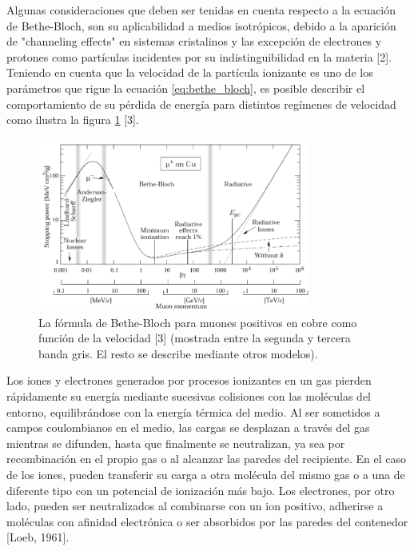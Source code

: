 \documentclass{article}
\begin{document}
\noindent Algunas consideraciones que deben ser tenidas en cuenta respecto a la ecuación de Bethe-Bloch, son su aplicabilidad a medios isotrópicos, debido a la aparición de "channeling effects" en sistemas cristalinos y las excepción de electrones y protones como partículas incidentes por su indistinguibilidad en la materia [2].\\

\noindent Teniendo en cuenta que la velocidad de la partícula ionizante es uno de los parámetros que rigue la ecuación \ref{eq:bethe_bloch}, es posible describir el comportamiento de su pérdida de energía para distintos regímenes de velocidad como ilustra la figura \ref{fig:bethe_b} [3].

\begin{figure}[H]
    \centering
    \includegraphics[width=0.8\textwidth]{bethe_bloch.PNG}
    \caption{La fórmula de Bethe-Bloch para muones positivos en cobre como función de la velocidad [3] (mostrada entre la segunda y tercera banda gris. El resto se describe mediante otros modelos).}
    \label{fig:bethe_b}

\end{figure}

\noindent Los iones y electrones generados por procesos ionizantes en un gas pierden rápidamente su energía mediante sucesivas colisiones con las moléculas del entorno, equilibrándose con la energía térmica del medio. Al ser sometidos a campos coulombianos en el medio, las cargas se desplazan a través del gas mientras se difunden, hasta que finalmente se neutralizan, ya sea por recombinación en el propio gas o al alcanzar las paredes del recipiente. En el caso de los iones, pueden transferir su carga a otra molécula del mismo gas o a una de diferente tipo con un potencial de ionización más bajo. Los electrones, por otro lado, pueden ser neutralizados al combinarse con un ion positivo, adherirse a moléculas con afinidad electrónica o ser absorbidos por las paredes del contenedor [Loeb, 1961].\\
\end{document}
